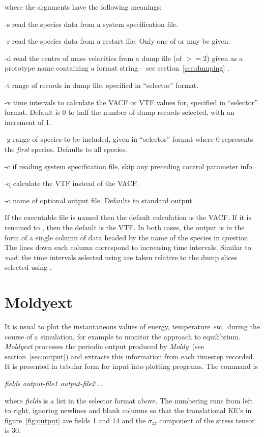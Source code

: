 \documentclass[a4paper,twoside]{report}
\newcommand{\moldy}{\emph{Moldy}}
\newcommand{\etc}{\emph{etc.}}
\begin{document}
where the arguments have the following meanings:
\begin{Argdescription}
\item[-s] read the species data from a system specification file.
\item[-r] read the species data from a restart file. Only one of  
or  may be given.
\item[-d] read the centre of mass velocities from a dump file (of  
$>= 2$) given as a prototype name containing a  format 
string -- see section~\ref{sec:dumping} .
\item[-t] range of records in dump file, specified in ``selector'' format.
\item[-v] time intervals to calculate the VACF or VTF values for, specified 
in ``selector'' format. Default is 0 to half the number of dump 
records selected, with an increment of 1.
\item[-g] range of species to be included, given in ``selector'' format 
where 0 represents the \emph{first} species. Defaults to all species.
\item[-c] if reading system specification file, skip any preceding control 
parameter info.
\item[-q] calculate the VTF instead of the VACF.
\item[-o] name of optional output file. Defaults to standard output.
\end{Argdescription}

If the executable file is named  then the default calculation 
is the VACF. If it is renamed to , then the default is the 
VTF. In both cases, the output is in the form of a single column 
of data headed by the name of the species in question. The lines 
down each column correspond to increasing time intervals. Similar 
to \emph{msd}, the time intervals selected using  are taken relative 
to the dump slices selected using . 

\section{Moldyext}%
It is usual to plot the instantaneous values of energy, temperature
\etc\ during the course of a simulation, for example to monitor the
approach to equilibrium.  \emph{Moldyext} processes the periodic
output produced by \moldy\ (see section~\ref{sec:output}) and extracts
this information from each timestep recorded.  It is presented in
tabular form for input into plotting programs.  The command is
\begin{center}
 \textit{fields output-file1 output-file2} \ldots
\end{center}
where \emph{fields} is a list in the selector format above.  The
numbering runs from left to right, ignoring newlines and blank columns
so that the translational KE's in figure~\ref{fig:output} are fields 1
and 14 and the $\sigma_{zz}$ component of the stress tensor is 30.
\end{document}
